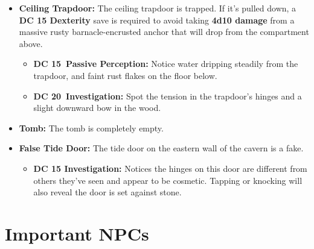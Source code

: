 \documentclass[10pt,twocolumn]{article}
\let\oldtextbf\textbf
\renewcommand{\textbf}[1]{\oldtextbf{{#1}}}
\providecommand{\tightlist}{
  \setlength{\itemsep}{4pt}
  \setlength{\topsep}{0pt}
  \setlength{\parsep}{0pt}
  \setlength{\parskip}{0pt}
  \setlength{\partopsep}{0pt}
}
\begin{document}
\begin{itemize}
\tightlist
\item
  \textbf{Ceiling Trapdoor:} The ceiling trapdoor is trapped. If it's
  pulled down, a \textbf{DC 15 Dexterity} save is required to avoid
  taking \textbf{4d10 damage} from a massive rusty barnacle-encrusted
  anchor that will drop from the compartment above.

  \begin{itemize}
  \tightlist
  \item
    \textbf{DC 15~Passive Perception:} Notice water dripping steadily
    from the trapdoor, and faint rust flakes on the floor below.
  \item
    \textbf{DC 20~Investigation:} Spot the tension in the trapdoor's
    hinges and a slight downward bow in the wood.
  \end{itemize}
\item
  \textbf{Tomb:} The tomb is completely empty.
\item
  \textbf{False Tide Door:} The tide door on the eastern wall of the
  cavern is a fake.

  \begin{itemize}
  \tightlist
  \item
    \textbf{DC 15 Investigation:} Notices the hinges on this door are
    different from others they've seen and appear to be cosmetic.
    Tapping or knocking will also reveal the door is set against stone.
  \end{itemize}
\end{itemize}

\section{Important NPCs}\label{important-npcs}
\end{document}
